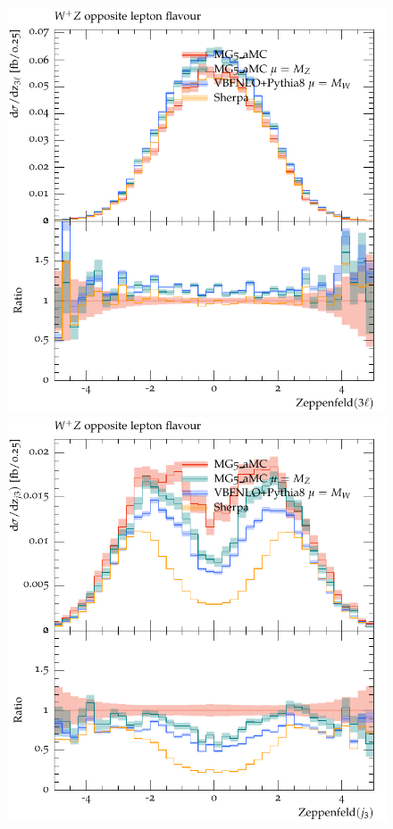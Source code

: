 \documentclass[11pt]{cernrep}
\begin{document}
\begin{figure}[htbp]
\begin{center}
   \includegraphics[scale=0.5]{figs/WpZ_OF_zep3l}
   \includegraphics[scale=0.5]{figs/WpZ_OF_zepj3}

\end{center}
\end{figure}
\end{document}
